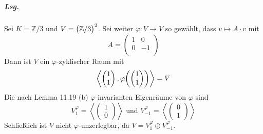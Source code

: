 \documentclass{scrreprt}
\begin{document}
\subparagraph{Lsg.} Sei $K = \mathbb{Z}/3$ und $V = \qty\big(\mathbb{Z}/3)^2$.
Sei weiter $\varphi \colon V \to V$ so gewählt, dass $v \mapsto A \cdot v$ mit
\[
  A = \begin{pmatrix}
    1 & 0 \\
    0 & -1 \\
  \end{pmatrix}
\]
Dann ist $V$ ein $\varphi$-zyklischer Raum mit
\[
  \left\langle
    \begin{pmatrix}1\\1\end{pmatrix},
    \varphi\qty(\begin{pmatrix}1\\1\end{pmatrix})
  \right\rangle = V
\]
Die nach Lemma 11.19 (b) $\varphi$-invarianten Eigenräume von $\varphi$ sind
\[
  V_1^{\varphi} = \left\langle
    \begin{pmatrix}1\\0\end{pmatrix}
  \right\rangle \text{ und } V_{-1}^{\varphi} = \left\langle
    \begin{pmatrix}0\\1\end{pmatrix}
  \right\rangle
\]
Schließlich ist $V$ nicht $\varphi$-unzerlegbar, da
$V = V_1^{\varphi} \oplus V_{-1}^{\varphi}$.

\newpage
\end{document}
